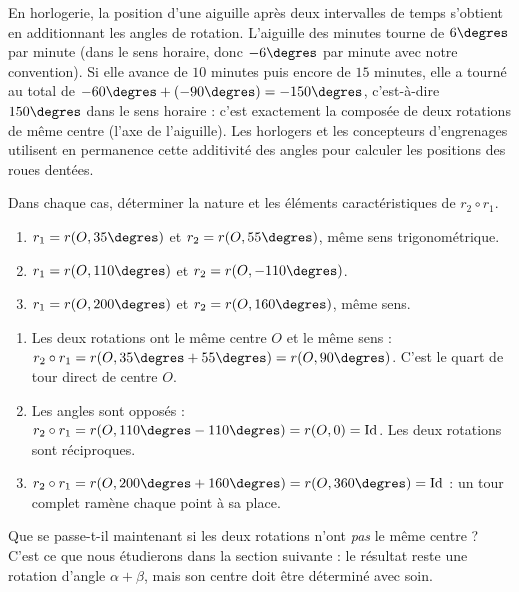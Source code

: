 \documentclass[11pt]{article}
\begin{document}
\begin{savaistu}[En horlogerie]
En horlogerie, la position d'une aiguille après deux intervalles de temps s'obtient en additionnant les angles de rotation. L'aiguille des minutes tourne de $6\degres$ par minute (dans le sens horaire, donc $-6\degres$ par minute avec notre convention). Si elle avance de $10$ minutes puis encore de $15$ minutes, elle a tourné au total de $-60\degres + (-90\degres) = -150\degres$, c'est-à-dire $150\degres$ dans le sens horaire : c'est exactement la composée de deux rotations de même centre (l'axe de l'aiguille). Les horlogers et les concepteurs d'engrenages utilisent en permanence cette additivité des angles pour calculer les positions des roues dentées.
\end{savaistu}

\begin{exercice}[À faire]
Dans chaque cas, déterminer la nature et les éléments caractéristiques de $r_2 \circ r_1$.
\begin{enumerate}
\item $r_1 = r(O, 35\degres)$ et $r_2 = r(O, 55\degres)$, même sens trigonométrique.
\item $r_1 = r(O, 110\degres)$ et $r_2 = r(O, -110\degres)$.
\item $r_1 = r(O, 200\degres)$ et $r_2 = r(O, 160\degres)$, même sens.
\end{enumerate}
\end{exercice}

\begin{corrige}
\begin{enumerate}
\item Les deux rotations ont le même centre $O$ et le même sens : $r_2 \circ r_1 = r(O, 35\degres + 55\degres) = r(O, 90\degres)$. C'est le quart de tour direct de centre $O$.
\item Les angles sont opposés : $r_2 \circ r_1 = r(O, 110\degres - 110\degres) = r(O, 0) = \mathrm{Id}$. Les deux rotations sont réciproques.
\item $r_2 \circ r_1 = r(O, 200\degres + 160\degres) = r(O, 360\degres) = \mathrm{Id}$ : un tour complet ramène chaque point à sa place.
\end{enumerate}
\end{corrige}

Que se passe-t-il maintenant si les deux rotations n'ont \emph{pas} le même centre ? C'est ce que nous étudierons dans la section suivante : le résultat reste une rotation d'angle $\alpha + \beta$, mais son centre doit être déterminé avec soin.
\end{document}
